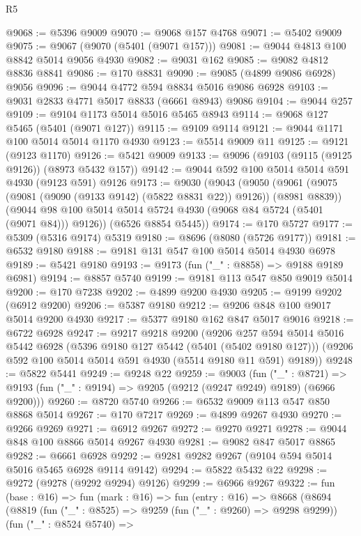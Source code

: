 \begin{lexlean}{R5}
\begin{coremodule}
@9068 := @5396 @9009
@9070 := @9068 @157 @4768
@9071 := @5402 @9009
@9075 := @9067 (@9070 (@5401 (@9071 @157)))
@9081 := @9044 @4813 @100 @8842 @5014 @9056 @4930
@9082 := @9031 @162
@9085 := @9082 @4812 @8836 @8841
@9086 := @170 @8831
@9090 := @9085 (@4899 @9086 @6928) @9056
@9096 := @9044 @4772 @594 @8834 @5016 @9086 @6928
@9103 := @9031 @2833 @4771 @5017 @8833 (@6661 @8943) @9086
@9104 := @9044 @257
@9109 := @9104 @1173 @5014 @5016 @5465 @8943
@9114 := @9068 @127 @5465 (@5401 (@9071 @127))
@9115 := @9109 @9114
@9121 := @9044 @1171 @100 @5014 @5014 @1170 @4930
@9123 := @5514 @9009 @11
@9125 := @9121 (@9123 @1170)
@9126 := @5421 @9009
@9133 := @9096 (@9103 (@9115 (@9125 @9126)) (@8973 @5432 @157))
@9142 := @9044 @592 @100 @5014 @5014 @591 @4930 (@9123 @591) @9126
@9173 := @9030
    (@9043
      (@9050
        (@9061 (@9075 (@9081 (@9090 (@9133 @9142) (@5822 @8831 @22)) @9126)) (@8981 @8839))
        (@9044 @98 @100 @5014 @5014 @5724 @4930 (@9068 @84 @5724 (@5401 (@9071 @84))) @9126))
      (@6526 @8854 @5445))
@9174 := @170 @5727
@9177 := @5309 (@5316 @9174) @5319
@9180 := @8696 (@8080 (@5726 @9177))
@9181 := @6532 @9180
@9188 := @9181 @131 @547 @100 @5014 @5014 @4930 @6978
@9189 := @5421 @9180
@9193 := @9173 (fun ("_" : @8858) => @9188 @9189 @6981)
@9194 := @8857 @5740
@9199 := @9181 @113 @547 @850 @9019 @5014
@9200 := @170 @7238
@9202 := @4899 @9200 @4930
@9205 := @9199 @9202 (@6912 @9200)
@9206 := @5387 @9180
@9212 := @9206 @848 @100 @9017 @5014 @9200 @4930
@9217 := @5377 @9180 @162 @847 @5017 @9016
@9218 := @6722 @6928
@9247 := @9217
    @9218
    @9200
    (@9206
      @257
      @594
      @5014
      @5016
      @5442
      @6928
      (@5396 @9180 @127 @5442 (@5401 (@5402 @9180 @127)))
      (@9206 @592 @100 @5014 @5014 @591 @4930 (@5514 @9180 @11 @591) @9189))
@9248 := @5822 @5441
@9249 := @9248 @22
@9259 := @9003
    (fun ("_" : @8721) =>
    @9193 (fun ("_" : @9194) => @9205 (@9212 (@9247 @9249) @9189) (@6966 @9200)))
@9260 := @8720 @5740
@9266 := @6532 @9009 @113 @547 @850 @8868 @5014
@9267 := @170 @7217
@9269 := @4899 @9267 @4930
@9270 := @9266 @9269
@9271 := @6912 @9267
@9272 := @9270 @9271
@9278 := @9044 @848 @100 @8866 @5014 @9267 @4930
@9281 := @9082 @847 @5017 @8865
@9282 := @6661 @6928
@9292 := @9281 @9282 @9267 (@9104 @594 @5014 @5016 @5465 @6928 @9114 @9142)
@9294 := @5822 @5432 @22
@9298 := @9272 (@9278 (@9292 @9294) @9126)
@9299 := @6966 @9267
@9322 := fun (base : @16) =>
  fun (mark : @16) =>
  fun (entry : @16) =>
  @8668
    (@8694
      (@8819
        (fun ("_" : @8525) => @9259 (fun ("_" : @9260) => @9298 @9299))
        (fun ("_" : @8524 @5740) =>

\end{coremodule}
\end{lexlean}
